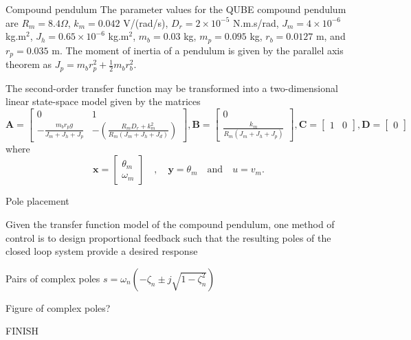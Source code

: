 \documentclass[9pt]{beamer-control}
\begin{document}
\begin{frame}{Compound pendulum}
The parameter values for the QUBE compound pendulum are $R_m=8.4\Omega$, $k_m=0.042$ V/(rad/s), $D_r=2\times 10^{-5}$ N.m.s/rad, $J_m = 4\times 10^{-6}$ kg.m$^2$, $J_h = 0.65 \times 10^{-6}$ kg.m$^2$, $m_b=0.03$ kg, $m_p=0.095$ kg, $r_b = 0.0127$ m, and $r_p = 0.035$ m.
The moment of inertia of a pendulum is given by the parallel axis theorem as $J_p = m_b r_p^2+ \tfrac{1}{2}m_b r_b^2$.

The second-order transfer function may be transformed into a two-dimensional linear state-space model given by the matrices
\[
\mathbf{A}=\begin{bmatrix}
	0 & 1 \\
	-\tfrac{m_br_p g }{J_m+J_h+J_p} & -\left(\tfrac{R_m D_r + k_m^2}{R_m(J_m+J_h+J_d)}\right)
\end{bmatrix},
\mathbf{B} = \begin{bmatrix}
	0 \\ \tfrac{k_m}{R_m(J_m+J_h+J_p)}
\end{bmatrix}, 
\mathbf{C} = \begin{bmatrix}
	1 & 0
\end{bmatrix},
\mathbf{D} = \begin{bmatrix}
	0
\end{bmatrix}
\]  
where 
\[\mathbf{x} = \begin{bmatrix}
	\theta_m \\ \omega_m
\end{bmatrix}
\quad , \quad \mathbf{y} = \theta_m \quad  \text{and} \quad u=v_m.\]
\end{frame}




\begin{frame}{Pole placement}

Given the transfer function model of the compound pendulum, one method of control is to design proportional feedback such that the resulting poles of the closed loop system provide a desired response

Pairs of complex poles $s=\omega_n (-\zeta_n \pm j \sqrt{1-\zeta_n^2})$


Figure of complex poles?

FINISH

\end{frame}
\end{document}
